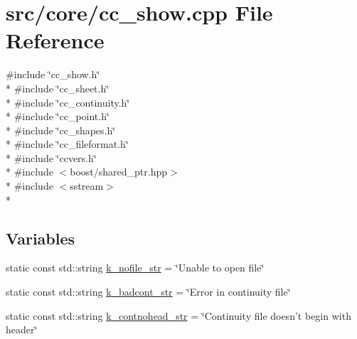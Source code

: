 \hypertarget{a00213}{\section{src/core/cc\-\_\-show.cpp File Reference}
\label{a00213}
}
{\ttfamily \#include \char`\"{}cc\-\_\-show.\-h\char`\"{}}\\*
{\ttfamily \#include \char`\"{}cc\-\_\-sheet.\-h\char`\"{}}\\*
{\ttfamily \#include \char`\"{}cc\-\_\-continuity.\-h\char`\"{}}\\*
{\ttfamily \#include \char`\"{}cc\-\_\-point.\-h\char`\"{}}\\*
{\ttfamily \#include \char`\"{}cc\-\_\-shapes.\-h\char`\"{}}\\*
{\ttfamily \#include \char`\"{}cc\-\_\-fileformat.\-h\char`\"{}}\\*
{\ttfamily \#include \char`\"{}ccvers.\-h\char`\"{}}\\*
{\ttfamily \#include $<$boost/shared\-\_\-ptr.\-hpp$>$}\\*
{\ttfamily \#include $<$sstream$>$}\\*
\subsection*{Variables}
\begin{DoxyCompactItemize}
\item 
static const std\-::string \hyperlink{a00213_a0bb48eb642ae5c070a2678fdf5aea5b8}{k\-\_\-nofile\-\_\-str} = \char`\"{}Unable to open file\char`\"{}
\item 
static const std\-::string \hyperlink{a00213_a760a72ad3121548c6c91caec9f3c3b33}{k\-\_\-badcont\-\_\-str} = \char`\"{}Error in continuity file\char`\"{}
\item 
static const std\-::string \hyperlink{a00213_a9458c3e81a038858995316d45bac1ee6}{k\-\_\-contnohead\-\_\-str} = \char`\"{}Continuity file doesn't begin with header\char`\"{}
\end{DoxyCompactItemize}


